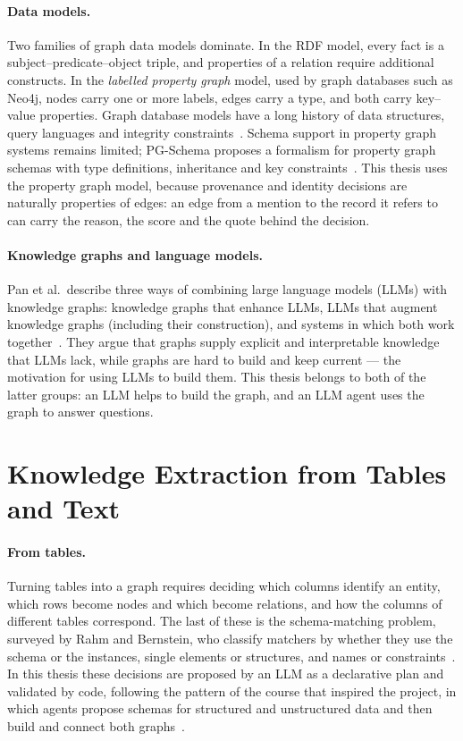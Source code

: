 \paragraph{Data models.} Two families of graph data models dominate. In the RDF model, every fact is a
subject--predicate--object triple, and properties of a relation require additional constructs. In the
\emph{labelled property graph} model, used by graph databases such as Neo4j, nodes carry one or more labels,
edges carry a type, and both carry key--value properties. Graph database models have a long history of
data structures, query languages and integrity constraints~\cite{angles2008survey}. Schema support in property
graph systems remains limited; PG-Schema proposes a formalism for property graph schemas with type
definitions, inheritance and key constraints~\cite{angles2023pgschema}. This thesis uses the property graph
model, because provenance and identity decisions are naturally properties of edges: an edge from a mention
to the record it refers to can carry the reason, the score and the quote behind the decision.

\paragraph{Knowledge graphs and language models.} Pan et al.\ describe three ways of combining large language
models (LLMs) with knowledge graphs: knowledge graphs that enhance LLMs, LLMs that augment knowledge graphs
(including their construction), and systems in which both work together~\cite{pan2024unifying}. They argue
that graphs supply explicit and interpretable knowledge that LLMs lack, while graphs are hard to build and keep
current --- the motivation for using LLMs to build them. This thesis belongs to both of the latter groups: an
LLM helps to build the graph, and an LLM agent uses the graph to answer questions.

\section{Knowledge Extraction from Tables and Text}\label{sec:ch02-knowledge-extraction-from-tables-a}

\paragraph{From tables.} Turning tables into a graph requires deciding which columns identify an entity,
which rows become nodes and which become relations, and how the columns of different tables correspond. The
last of these is the schema-matching problem, surveyed by Rahm and Bernstein, who classify matchers by whether
they use the schema or the instances, single elements or structures, and names or constraints~\cite{rahm2001survey}.
In this thesis these decisions are proposed by an LLM as a declarative plan and validated by code, following
the pattern of the course that inspired the project, in which agents propose schemas for structured and
unstructured data and then build and connect both graphs~\cite{kollegger2025agentic}.

